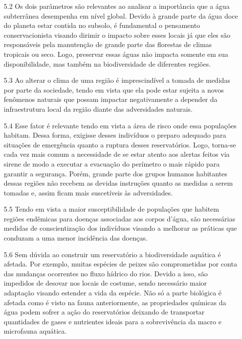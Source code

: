 \documentclass[a4paper, 12pt]{article}
\begin{document}
\begin{enumerate}
        \item[5.2] Os dois parâmetros são relevantes ao analisar a importância que a água subterrânea desempenha em nível global. Devido à grande parte da água doce do planeta estar contida no subsolo, é fundamental o pensamento conservacionista visando dirimir o impacto sobre esses locais já que eles são responsáveis pela manutenção de grande parte das florestas de climas tropicais ou seco. Logo, preservar essas águas não impacta somente em sua disponibilidade, mas também na biodiversidade de diferentes regiões. 
        
        \item[5.3] Ao alterar o clima de uma região é imprescindível a tomada de medidas por parte da sociedade, tendo em vista que ela pode estar sujeita a novos fenômenos naturais que possam impactar negativamente a depender da infraestrutura local da região diante das adversidades naturais. 
        
        \item[5.4] Esse fator é relevante tendo em vista a área de risco onde essa populações habitam. Dessa forma, exigisse desses indivíduos o preparo adequado para situações de emergência quanto a ruptura desses reservatórios. Logo, torna-se cada vez mais comum a necessidade de se estar atento aos alertas feitos via sirene de modo a executar a evacuação do perímetro o mais rápido para garantir a segurança. Porém, grande parte dos grupos humanos habitantes dessas regiões não recebem as devidas instruções quanto as medidas a serem tomadas e, assim ficam mais suscetíveis às adversidades.
        
        \item[5.5] Tendo em vista a maior susceptibilidade de 
        populações que habitem regiões endêmicas para doenças associadas aos corpos d'água, são necessárias medidas de conscientização dos indivíduos visando a melhorar as práticas que conduzam a uma menor incidência das doenças. 
        
        \item[5.6] Sem dúvida ao construir um reservatório a biodiversidade aquática é afetada. Por exemplo, muitas espécies de peixes são comprometidas por conta das mudanças ocorrentes no fluxo hídrico do rios. Devido a isso, são impedidos de desovar nos locais de costume, sendo necessário maior adaptação visando estender a vida da espécie. Não só a parte biológica é afetada como é visto na fauna anteriormente, as propriedades químicas da água podem sofrer a ação do reservatórios deixando de transportar quantidades de gases e nutrientes ideais para a sobrevivência da macro e microfauna aquática.
        

\end{enumerate}
\end{document}
